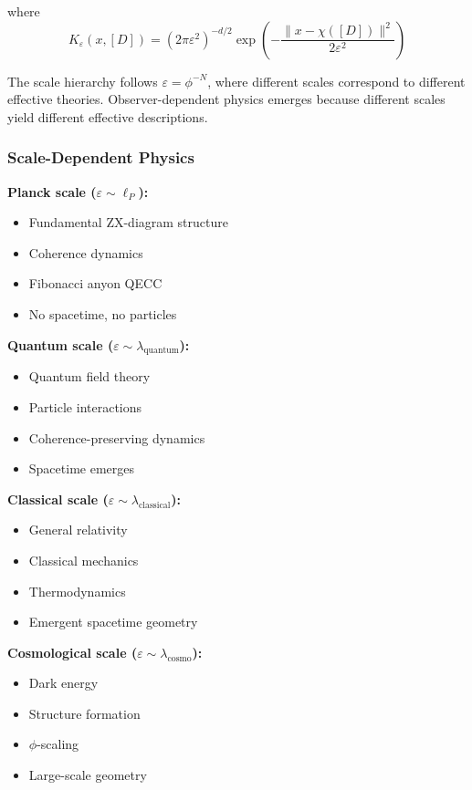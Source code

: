 \documentclass[11pt]{article}
\theoremstyle{definition}
\newcommand{\goldenratio}{\phi}
\begin{document}
where
\begin{equation}
K_\varepsilon(x, [D]) = (2\pi\varepsilon^2)^{-d/2} \exp\left(-\frac{\|x - \chi([D])\|^2}{2\varepsilon^2}\right)
\end{equation}

The scale hierarchy follows $\varepsilon = \goldenratio^{-N}$, where different scales correspond to different effective theories. Observer-dependent physics emerges because different scales yield different effective descriptions.

\subsubsection{Scale-Dependent Physics}

\textbf{Planck scale ($\varepsilon \sim \ell_P$):}
\begin{itemize}
\item Fundamental ZX-diagram structure
\item Coherence dynamics
\item Fibonacci anyon QECC
\item No spacetime, no particles
\end{itemize}

\textbf{Quantum scale ($\varepsilon \sim \lambda_{\text{quantum}}$):}
\begin{itemize}
\item Quantum field theory
\item Particle interactions
\item Coherence-preserving dynamics
\item Spacetime emerges
\end{itemize}

\textbf{Classical scale ($\varepsilon \sim \lambda_{\text{classical}}$):}
\begin{itemize}
\item General relativity
\item Classical mechanics
\item Thermodynamics
\item Emergent spacetime geometry
\end{itemize}

\textbf{Cosmological scale ($\varepsilon \sim \lambda_{\text{cosmo}}$):}
\begin{itemize}
\item Dark energy
\item Structure formation
\item $\goldenratio$-scaling
\item Large-scale geometry
\end{itemize}
\end{document}
